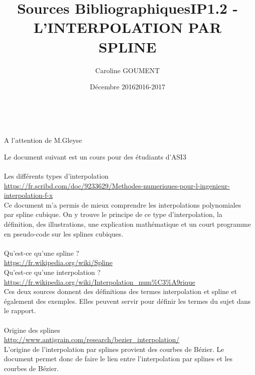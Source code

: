 \documentclass{article}
\title{Sources Bibliographiques}
\author{Caroline GOUMENT}
\date{D\'ecembre 2016}
\begin{document}
\maketitle

\vspace{10\baselineskip}
\begin{center}
\makeatother
\title{IP1.2 - L'INTERPOLATION PAR SPLINE}\\
\end{center}

\vspace{12\baselineskip}
\begin{center}
A l'attention de M.Gleyse\\
\date{2016-2017}
\end{center}

\newpage
\begingroup\raggedleft
Le document suivant est un cours pour des \'etudiants d'ASI3
\endgroup
\\\\
Les diff\'erents types d'interpolation
\\
{\color{blue}
\url{https://fr.scribd.com/doc/9233629/Methodes-numeriques-pour-l-ingenieur-interpolation-f-x}}
\\
Ce document m'a permis de mieux comprendre les interpolations polynomiales par spline cubique. On y trouve le principe de ce type d'interpolation, la d\'efinition, des illustrations, une explication math\'ematique et un court programme en pseudo-code sur les splines cubiques.
\\\\
Qu'est-ce qu'une spline ?
\\
{\color{blue}
\url{https://fr.wikipedia.org/wiki/Spline}}
\\ 
Qu'est-ce qu'une interpolation ?
\\
{\color{blue}
\url{https://fr.wikipedia.org/wiki/Interpolation_num%C3%A9rique}}
\\ 
Ces deux sources donnent des d\'efinitions des termes interpolation et spline et \'egalement des exemples. Elles peuvent servir pour d\'efinir les termes du sujet dans le rapport.
\\\\
Origine des splines
\\
{\color{blue}
\url{http://www.antigrain.com/research/bezier_interpolation/}}
\\
L'origine de l'interpolation par splines provient des courbes de B\'ezier. Le document permet donc de faire le lien entre l'interpolation par splines et les courbes de B\'ezier.
\end{document}
